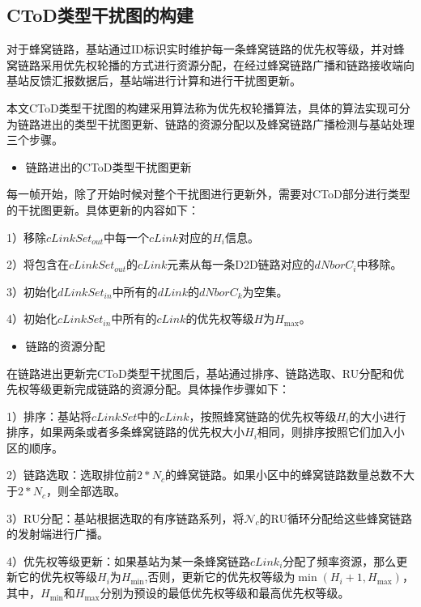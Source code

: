 \documentclass[figurelist,tablelist,algorithmlist,nomlist,masters]{seuthesix}
\begin{document}
	\subsection{CToD类型干扰图的构建}
	
	对于蜂窝链路，基站通过ID标识实时维护每一条蜂窝链路的优先权等级，并对蜂窝链路采用优先权轮播的方式进行资源分配，在经过蜂窝链路广播和链路接收端向基站反馈汇报数据后，基站端进行计算和进行干扰图更新。
	
	本文CToD类型干扰图的构建采用算法称为优先权轮播算法，具体的算法实现可分为链路进出的类型干扰图更新、链路的资源分配以及蜂窝链路广播检测与基站处理三个步骤。
	
	\begin{itemize}
		\item 链路进出的CToD类型干扰图更新
	\end{itemize}
	
	每一帧开始，除了开始时候对整个干扰图进行更新外，需要对CToD部分进行类型的干扰图更新。具体更新的内容如下：
	
	1）移除$cLinkSet_{out}$中每一个$cLink$对应的${H_i}$信息。
	
	2）将包含在$cLinkSet_{out}$的$cLink$元素从每一条D2D链路对应的$dNborC_i$中移除。
	
	3）初始化$dLinkSet_{in}$中所有的$dLink$的$dNborC_k$为空集。
	
	4）初始化$cLinkSet_{in}$中所有的$cLink$的优先权等级${H}$为${H_{\max }}$。
	
	\begin{itemize}
		\item 链路的资源分配
	\end{itemize}
	
	在链路进出更新完CToD类型干扰图后，基站通过排序、链路选取、RU分配和优先权等级更新完成链路的资源分配。具体操作步骤如下：
	
	1）排序：基站将$cLinkSet$中的$cLink$，按照蜂窝链路的优先权等级${H_i}$的大小进行排序，如果两条或者多条蜂窝链路的优先权大小${H_i}$相同，则排序按照它们加入小区的顺序。
	
	2）链路选取：选取排位前$2*N_c$的蜂窝链路。如果小区中的蜂窝链路数量总数不大于$2*N_c$，则全部选取。
	
	3）RU分配：基站根据选取的有序链路系列，将$\mathcal{N}_c$的RU循环分配给这些蜂窝链路的发射端进行广播。
	
	4）优先权等级更新：如果基站为某一条蜂窝链路$cLink_i$分配了频率资源，那么更新它的优先权等级${H_i}$为${H_{\min }}$,否则，更新它的优先权等级为$\min ({H_i} + 1,{H_{\max }})$，其中，${H_{\min }}$和${H_{\max }}$分别为预设的最低优先权等级和最高优先权等级。
	
\end{document}
